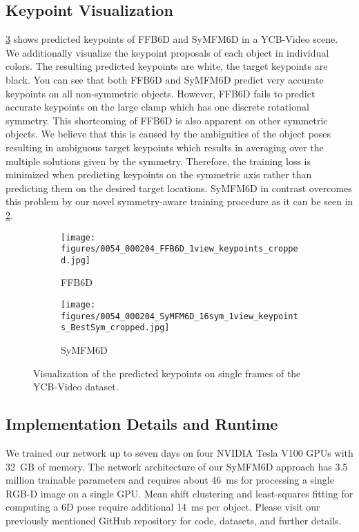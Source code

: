 \subsection{Keypoint Visualization}

\cref{fig_ycbv_sv_keypoints} shows predicted keypoints of FFB6D and SyMFM6D in a YCB-Video scene. We additionally visualize the keypoint proposals of each object in individual colors.
The resulting predicted keypoints are white, the target keypoints are black. You can see that both FFB6D and SyMFM6D predict very accurate keypoints on all non-symmetric objects. However, FFB6D fails to predict accurate keypoints on the large clamp which has one discrete rotational symmetry. This shortcoming of FFB6D is also apparent on other symmetric objects. We believe that this is caused by the ambiguities of the object poses resulting in ambiguous target keypoints which results in averaging over the multiple solutions given by the symmetry. Therefore, the training loss is minimized when predicting keypoints on the symmetric axis rather than predicting them on the desired target locations. SyMFM6D in contrast overcomes this problem by our novel symmetry-aware training procedure as it can be seen in \cref{fig_ycbv_sv_keypoints_SyMFM6D}.

\begin{figure}[!tbh]
  \centering
\begin{subfigure}[b]{0.49\columnwidth}
  \texttt{[image: figures/0054\_000204\_FFB6D\_1view\_keypoints\_cropped.jpg]}
   \caption{FFB6D}
   \label{fig_ycbv_sv_keypoints_FFB6D}
\end{subfigure}
\begin{subfigure}[b]{0.49\columnwidth}
  \centering
  \texttt{[image: figures/0054\_000204\_SyMFM6D\_16sym\_1view\_keypoints\_BestSym\_cropped.jpg]}
   \caption{SyMFM6D}
   \label{fig_ycbv_sv_keypoints_SyMFM6D}
   \end{subfigure}
	\caption{Visualization of the predicted keypoints on single frames of the YCB-Video dataset.} 
   \label{fig_ycbv_sv_keypoints}
\end{figure}


\subsection{Implementation Details and Runtime}

We trained our network up to seven days on four NVIDIA Tesla V100 GPUs with \SI{32}{GB} of memory. 
The network architecture of our SyMFM6D approach has 3.5 million trainable parameters and requires about \SI{46}{ms} for processing a single RGB-D image on a single GPU. 
Mean shift clustering and least-squares fitting for computing a 6D pose require additional \SI{14}{ms} per object. 
Please visit our previously mentioned GitHub repository for code, datasets, and further details.
